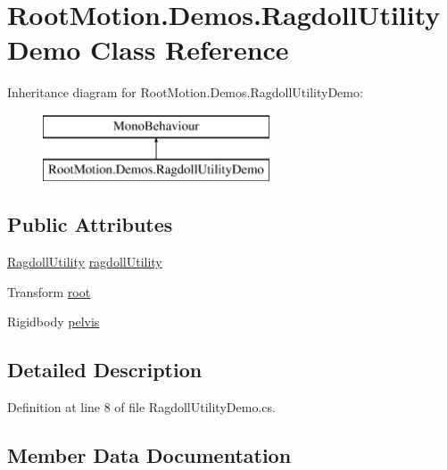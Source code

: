\hypertarget{class_root_motion_1_1_demos_1_1_ragdoll_utility_demo}{}\section{Root\+Motion.\+Demos.\+Ragdoll\+Utility\+Demo Class Reference}
\label{class_root_motion_1_1_demos_1_1_ragdoll_utility_demo}
Inheritance diagram for Root\+Motion.\+Demos.\+Ragdoll\+Utility\+Demo\+:\begin{figure}[H]
\begin{center}
\leavevmode
\includegraphics[height=2.000000cm]{class_root_motion_1_1_demos_1_1_ragdoll_utility_demo}
\end{center}
\end{figure}
\subsection*{Public Attributes}
\begin{DoxyCompactItemize}
\item 
\mbox{\hyperlink{class_root_motion_1_1_final_i_k_1_1_ragdoll_utility}{Ragdoll\+Utility}} \mbox{\hyperlink{class_root_motion_1_1_demos_1_1_ragdoll_utility_demo_a31dd4befe46bbc31a0ef04adb33eb70a}{ragdoll\+Utility}}
\item 
Transform \mbox{\hyperlink{class_root_motion_1_1_demos_1_1_ragdoll_utility_demo_a20bf8cbf48c66215defc0c93d6c8ddbc}{root}}
\item 
Rigidbody \mbox{\hyperlink{class_root_motion_1_1_demos_1_1_ragdoll_utility_demo_ac3d97a2c158f761a29e402a769159caf}{pelvis}}
\end{DoxyCompactItemize}


\subsection{Detailed Description}


Definition at line 8 of file Ragdoll\+Utility\+Demo.\+cs.



\subsection{Member Data Documentation}
\mbox{\label{class_root_motion_1_1_demos_1_1_ragdoll_utility_demo_ac3d97a2c158f761a29e402a769159caf}} 
